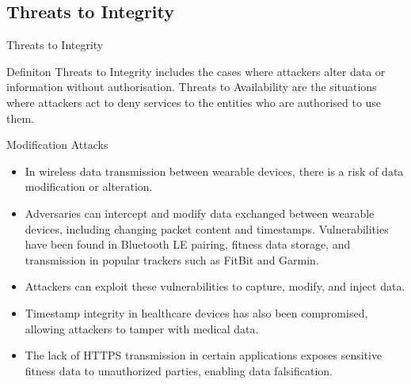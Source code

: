 \documentclass[ucs,9pt]{beamer}
\begin{document}
\subsection{Threats to Integrity}


\begin{frame}{Threats to Integrity}
	\begin{alertblock}{Definiton}
		Threats to Integrity includes the cases  where attackers alter data or information without authorisation.  Threats to Availability are the situations where attackers act  to deny services to the entities who are authorised to use them.
	\end{alertblock}
	
\end{frame}



\begin{frame}{Modification Attacks}
	\begin{itemize}
		\item In wireless data transmission between wearable devices, there is a risk of data modification or alteration. 
		\item Adversaries can intercept and modify data exchanged between wearable devices, including changing packet content and timestamps. Vulnerabilities have been found in Bluetooth LE pairing, fitness data storage, and transmission in popular trackers such as FitBit and Garmin.
		\item Attackers can exploit these vulnerabilities to capture, modify, and inject data. 
		\item Timestamp integrity in healthcare devices has also been compromised, allowing attackers to tamper with medical data.
		\item The lack of HTTPS transmission in certain applications exposes sensitive fitness data to unauthorized parties, enabling data falsification.
	\end{itemize}
\end{frame}
\end{document}
